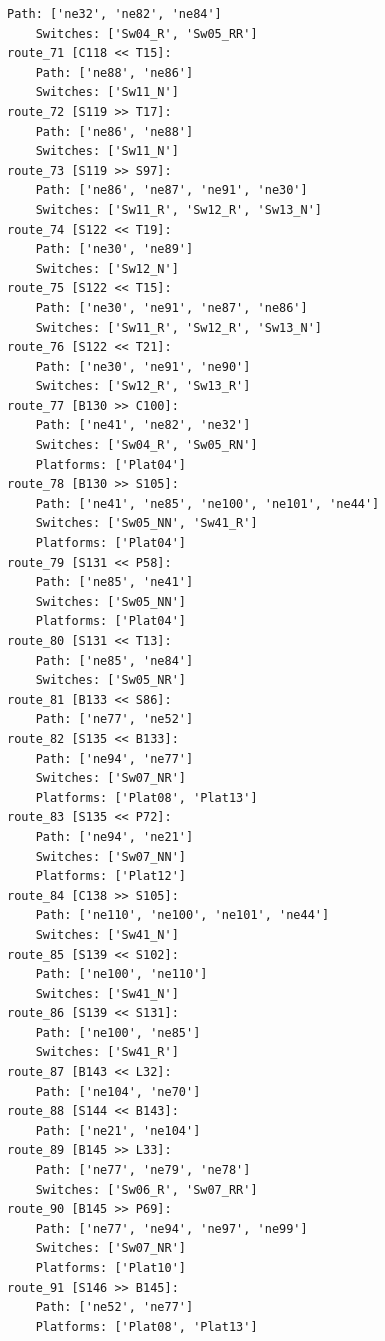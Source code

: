 \begin{lstlisting}[language = {}, tabsize=4, basicstyle=\footnotesize\ttfamily, showspaces=false, showstringspaces=false, caption = Routes.RNA, label = {lst:EJ3_7}]
	Path: ['ne32', 'ne82', 'ne84']
	Switches: ['Sw04_R', 'Sw05_RR']
route_71 [C118 << T15]:
	Path: ['ne88', 'ne86']
	Switches: ['Sw11_N']
route_72 [S119 >> T17]:
	Path: ['ne86', 'ne88']	
	Switches: ['Sw11_N']
route_73 [S119 >> S97]:
	Path: ['ne86', 'ne87', 'ne91', 'ne30']
	Switches: ['Sw11_R', 'Sw12_R', 'Sw13_N']
route_74 [S122 << T19]:
	Path: ['ne30', 'ne89']
	Switches: ['Sw12_N']
route_75 [S122 << T15]:
	Path: ['ne30', 'ne91', 'ne87', 'ne86']
	Switches: ['Sw11_R', 'Sw12_R', 'Sw13_N']
route_76 [S122 << T21]:
	Path: ['ne30', 'ne91', 'ne90']
	Switches: ['Sw12_R', 'Sw13_R']
route_77 [B130 >> C100]:
	Path: ['ne41', 'ne82', 'ne32']
	Switches: ['Sw04_R', 'Sw05_RN']
	Platforms: ['Plat04']
route_78 [B130 >> S105]:	
	Path: ['ne41', 'ne85', 'ne100', 'ne101', 'ne44']
	Switches: ['Sw05_NN', 'Sw41_R']
	Platforms: ['Plat04']
route_79 [S131 << P58]:
	Path: ['ne85', 'ne41']
	Switches: ['Sw05_NN']
	Platforms: ['Plat04']
route_80 [S131 << T13]:
	Path: ['ne85', 'ne84']
	Switches: ['Sw05_NR']
route_81 [B133 << S86]:
	Path: ['ne77', 'ne52']
route_82 [S135 << B133]:
	Path: ['ne94', 'ne77']
	Switches: ['Sw07_NR']
	Platforms: ['Plat08', 'Plat13']
route_83 [S135 << P72]:
	Path: ['ne94', 'ne21']
	Switches: ['Sw07_NN']
	Platforms: ['Plat12']
route_84 [C138 >> S105]:
	Path: ['ne110', 'ne100', 'ne101', 'ne44']	
	Switches: ['Sw41_N']
route_85 [S139 << S102]:
	Path: ['ne100', 'ne110']
	Switches: ['Sw41_N']
route_86 [S139 << S131]:
	Path: ['ne100', 'ne85']
	Switches: ['Sw41_R']
route_87 [B143 << L32]:
	Path: ['ne104', 'ne70']
route_88 [S144 << B143]:
	Path: ['ne21', 'ne104']
route_89 [B145 >> L33]:
	Path: ['ne77', 'ne79', 'ne78']
	Switches: ['Sw06_R', 'Sw07_RR']
route_90 [B145 >> P69]:
	Path: ['ne77', 'ne94', 'ne97', 'ne99']
	Switches: ['Sw07_NR']
	Platforms: ['Plat10']
route_91 [S146 >> B145]:
	Path: ['ne52', 'ne77']
	Platforms: ['Plat08', 'Plat13']
	\end{lstlisting}